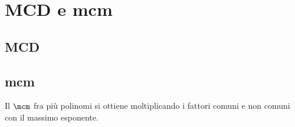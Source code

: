 \chapter{MCD e mcm}
\label{cha:mcmmcdpolinomi}
\minitoc
\mtcskip                                %
\minilof                                %
\mtcskip                                %
\minilot
\section{MCD}
\label{secMCDpolinomi}

\section{mcm}
\label{sec:mcmpolinomi}
Il $\mcm$ fra più polinomi si ottiene moltiplicando i fattori comuni  e non comuni con il massimo esponente.

